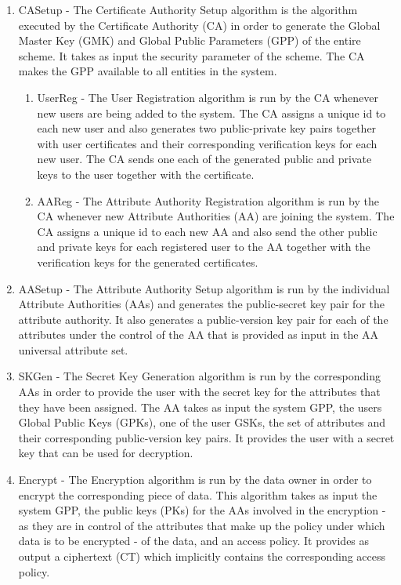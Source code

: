 \begin{enumerate}[label=(\arabic*)]
	
	\item CASetup - The Certificate Authority Setup algorithm is the algorithm executed by the Certificate Authority (CA) in order to generate the Global Master Key (GMK) and Global Public Parameters (GPP) of the entire scheme. It takes as input the security parameter of the scheme.  The CA makes the GPP available to all entities in the system.
	
	\begin{enumerate}
		
		\item UserReg - The User Registration algorithm is run by the CA whenever new users are being added to the system. The CA assigns a unique id to each new user and also generates two public-private key pairs together with user certificates and their corresponding verification keys for each new user. The CA sends one each of the generated public and private keys to the user together with the certificate.
		
		\item AAReg - The Attribute Authority Registration algorithm is run by the CA whenever new Attribute Authorities (AA) are joining the system. The CA assigns a unique id to each new AA and also send the other public and private keys for each registered user to the AA together with the verification keys for the generated certificates.
		
	\end{enumerate}
	
	\item AASetup - The Attribute Authority Setup algorithm is run by the individual Attribute Authorities (AAs) and generates the public-secret key pair for the attribute authority. It also generates a public-version key pair for each of the attributes under the control of the AA that is provided as input in the AA universal attribute set.
	
	\item SKGen - The Secret Key Generation algorithm is run by the corresponding AAs in order to provide the user with the secret key for the attributes that they have been assigned. The AA takes as input the system GPP, the users Global Public Keys (GPKs), one of the user GSKs, the set of attributes and their corresponding public-version key pairs. It provides the user with a secret key that can be used for decryption.
	
	\item Encrypt - The Encryption algorithm is run by the data owner in order to encrypt the corresponding piece of data. This algorithm takes as input the system GPP, the public keys (PKs) for the AAs involved in the encryption - as they are in control of the attributes that make up the policy under which data is to be encrypted - of the data, and an access policy. It provides as output a ciphertext (CT) which implicitly contains the corresponding access policy.
	

\end{enumerate}
